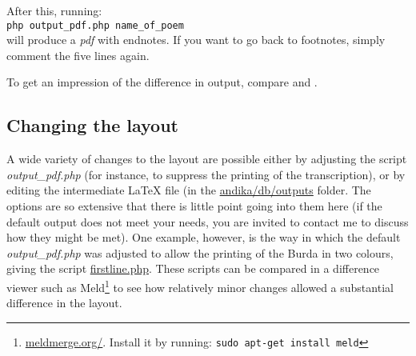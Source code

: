 After this, running:\\
\verb|php output_pdf.php name_of_poem|\\
will produce a \textit{pdf} with endnotes.  If you want to go back to footnotes, simply comment the five lines again.

To get an impression of the difference in output, compare  and .

\subsection{Changing the layout}

A wide variety of changes to the layout are possible either by adjusting the script \textit{output_pdf.php} (for instance, to suppress the printing of the transcription), or by editing the intermediate LaTeX file (in the \url{andika/db/outputs} folder.  The options are so extensive that there is little point going into them here (if the default output does not meet your needs, you are invited to contact me to discuss how they might be met).  One example, however, is the way in which the default \textit{output_pdf.php} was adjusted to allow the printing of the Burda  in two colours, giving the script \url{firstline.php}.  These scripts can be compared  in a difference viewer such as Meld\footnote{\url{meldmerge.org/}.  Install it by running: \texttt{sudo apt-get install meld}} to see how relatively minor changes allowed a substantial difference in the layout.


